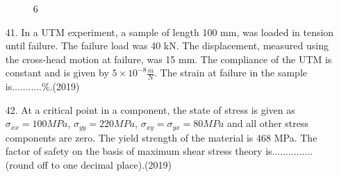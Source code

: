 \documentclass[journal]{IEEEtran}
\begin{document}
\begin{enumerate}
    \begin{figure}[!ht]
        \centering
        \caption{6}
    \end{figure}
    \item[41.] In a UTM experiment, a sample of length 100 mm, was loaded in tension until failure. The failure load was 40 kN. The displacement, measured using the cross-head motion at failure, was 15 mm. The compliance of the UTM is constant and is given by $5\times 10^{-8}\frac{m}{N}$. The strain at failure in the sample is...........\%.\hfill (2019)
    \item[42.] At a critical point in a component, the state of stress is given as $\sigma_{xx}=100MPa$, $\sigma_{yy} = 220MPa$, $\sigma_{xy}= \sigma_{yx}=80MPa$ and all other stress components are zero. The yield strength of the material is 468 MPa. The factor of safety on the basis of maximum shear stress theory is...............(round off to one decimal place).\hfill (2019)  
\end{enumerate}
\end{document}
